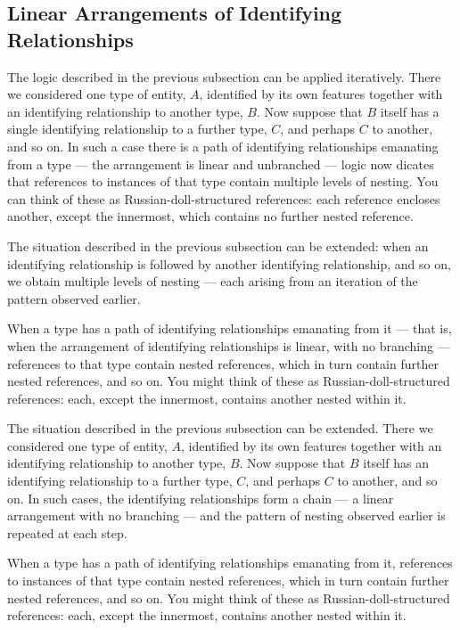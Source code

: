 \subsection{Linear Arrangements of Identifying Relationships}
\begin{newtt}
The logic described in the previous subsection can be applied iteratively.
There we considered one type of entity, $A$, identified by its own features together with an identifying relationship to another type, $B$.
Now suppose that $B$ itself has a single identifying relationship to a further type, $C$, and perhaps $C$ to another, and so on.
In such a case there is a path of identifying relationships emanating from a type --- the arrangement is linear and unbranched --- logic now dicates that
 references to instances of that type contain multiple levels of nesting.
You can think of these as Russian-doll-structured references: each reference encloses another, except the innermost, which contains no further nested reference.
\end{newtt}
\begin{oldtt}
\begin{worktt}
The situation described in the previous subsection can be extended: when an identifying relationship is followed by another identifying relationship, and so on, we obtain multiple levels of nesting — each arising from an iteration of the pattern observed earlier.
\end{worktt}
When a type has a path of identifying relationships emanating from it — that is, when the arrangement of identifying relationships is linear, with no branching — references to that type contain nested references, which in turn contain further nested references, and so on.
You might think of these as Russian-doll-structured references: each, except the innermost, contains another nested within it.
\end{oldtt}

The situation described in the previous subsection can be extended.
There we considered one type of entity, $A$, identified by its own features together with an identifying relationship to another type, $B$.
Now suppose that $B$ itself has an identifying relationship to a further type, $C$, and perhaps $C$ to another, and so on.
In such cases, the identifying relationships form a chain — a linear arrangement with no branching — and the pattern of nesting observed earlier is repeated at each step.

When a type has a path of identifying relationships emanating from it, references to instances of that type contain nested references, which in turn contain further nested references, and so on.
You might think of these as Russian-doll-structured references: each, except the innermost, contains another nested within it.


